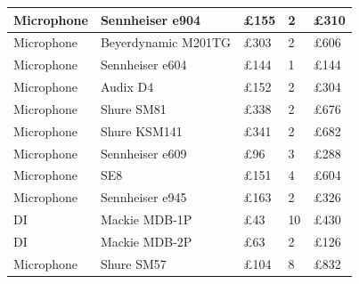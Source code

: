 \begin{longtable}[H]{|p{3cm}|p{4cm}|p{2cm}|p{3cm}|p{2cm}|}
\rowcolor[HTML]{EFEFEF} 
\cellcolor[HTML]{EFEFEF}Microphone & Sennheiser e904                    & £155                          & 2                                  & £310   \\ \hline
\rowcolor[HTML]{EFEFEF} 
\cellcolor[HTML]{EFEFEF}Microphone & Beyerdynamic M201TG                & £303                          & 2                                  & £606   \\ \hline
\rowcolor[HTML]{EFEFEF} 
\cellcolor[HTML]{EFEFEF}Microphone & Sennheiser e604                    & £144                          & 1                                  & £144   \\ \hline
\rowcolor[HTML]{EFEFEF} 
\cellcolor[HTML]{EFEFEF}Microphone & Audix D4                           & £152                          & 2                                  & £304   \\ \hline
\rowcolor[HTML]{EFEFEF} 
\cellcolor[HTML]{EFEFEF}Microphone & Shure SM81                         & £338                          & 2                                  & £676   \\ \hline
\rowcolor[HTML]{EFEFEF} 
\cellcolor[HTML]{EFEFEF}Microphone & Shure KSM141                       & £341                          & 2                                  & £682   \\ \hline
\rowcolor[HTML]{EFEFEF} 
\cellcolor[HTML]{EFEFEF}Microphone & Sennheiser e609                    & £96                           & 3                                  & £288   \\ \hline
\rowcolor[HTML]{EFEFEF} 
\cellcolor[HTML]{EFEFEF}Microphone & SE8                                & £151                          & 4                                  & £604   \\ \hline
\rowcolor[HTML]{EFEFEF} 
\cellcolor[HTML]{EFEFEF}Microphone & Sennheiser e945                    & £163                          & 2                                  & £326   \\ \hline
\rowcolor[HTML]{EFEFEF} 
\cellcolor[HTML]{EFEFEF}DI         & Mackie MDB-1P                      & £43                           & 10                                 & £430   \\ \hline
\rowcolor[HTML]{EFEFEF} 
\cellcolor[HTML]{EFEFEF}DI         & Mackie MDB-2P                      & £63                           & 2                                  & £126   \\ \hline
\rowcolor[HTML]{EFEFEF} 
Microphone                         & Shure SM57                         & £104                          & 8                                  & £832   \\ \hline

\end{longtable}

